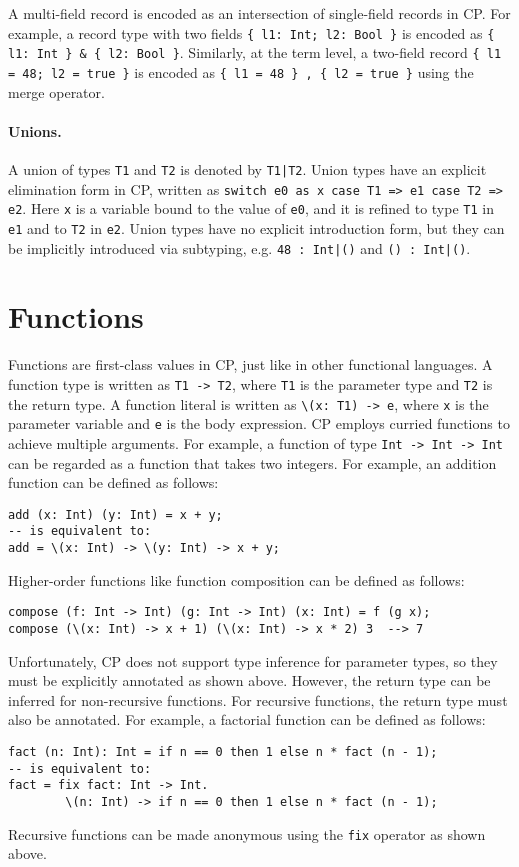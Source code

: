 \begin{tipblock}
A multi-field record is encoded as an intersection of single-field records in
CP. For example, a record type with two fields \lstinline|{ l1: Int; l2: Bool }|
is encoded as \lstinline|{ l1: Int } & { l2: Bool }|. Similarly, at the term
level, a two-field record \lstinline|{ l1 = 48; l2 = true }| is encoded as
\lstinline|{ l1 = 48 } , { l2 = true }| using the merge operator.
\end{tipblock}

\paragraph{Unions.}
A union of types \lstinline{T1} and \lstinline{T2} is denoted by
\lstinline{T1|T2}. Union types have an explicit elimination form in CP, written
as \lstinline{switch e0 as x case T1 => e1 case T2 => e2}. Here \lstinline{x} is
a variable bound to the value of \lstinline{e0}, and it is refined to type
\lstinline{T1} in \lstinline{e1} and to \lstinline{T2} in \lstinline{e2}. Union
types have no explicit introduction form, but they can be implicitly introduced
via subtyping, e.g. \lstinline{48 : Int|()} and \lstinline{() : Int|()}.

\section{Functions}

Functions are first-class values in CP, just like in other functional languages.
A function type is written as \lstinline{T1 -> T2}, where \lstinline{T1} is the
parameter type and \lstinline{T2} is the return type. A function literal is
written as \lstinline|\(x: T1) -> e|, where \lstinline{x} is the parameter
variable and \lstinline{e} is the body expression. CP employs curried functions
to achieve multiple arguments. For example, a function of type
\lstinline{Int -> Int -> Int} can be regarded as a function that takes two
integers. For example, an addition function can be defined as follows:
\begin{lstlisting}
add (x: Int) (y: Int) = x + y;
-- is equivalent to:
add = \(x: Int) -> \(y: Int) -> x + y;
\end{lstlisting}
Higher-order functions like function composition can be defined as follows:
\begin{lstlisting}
compose (f: Int -> Int) (g: Int -> Int) (x: Int) = f (g x);
compose (\(x: Int) -> x + 1) (\(x: Int) -> x * 2) 3  --> 7
\end{lstlisting}
Unfortunately, CP does not support type inference for parameter types, so they
must be explicitly annotated as shown above. However, the return type can be
inferred for non-recursive functions. For recursive functions, the return type
must also be annotated. For example, a factorial function can be defined as
follows:
\begin{lstlisting}
fact (n: Int): Int = if n == 0 then 1 else n * fact (n - 1);
-- is equivalent to:
fact = fix fact: Int -> Int.
        \(n: Int) -> if n == 0 then 1 else n * fact (n - 1);
\end{lstlisting}
Recursive functions can be made anonymous using the \lstinline{fix} operator as
shown above.

